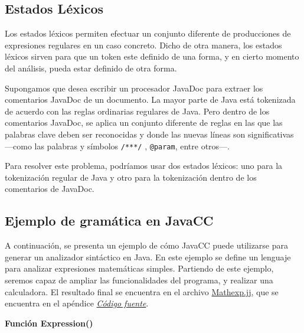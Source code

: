 \subsection{Estados Léxicos}
\noindent Los estados léxicos permiten efectuar un conjunto diferente de producciones de expresiones regulares en un caso concreto. Dicho de otra manera, los estados léxicos sirven para que un token este definido de una forma, y en cierto momento del análisis, pueda estar definido de otra forma.

Supongamos que desea escribir un procesador JavaDoc para extraer los comentarios JavaDoc de un documento. La mayor parte de Java está tokenizada de acuerdo con las reglas ordinarias regulares de Java. Pero dentro de los comentarios JavaDoc, se aplica un conjunto diferente de reglas en las que las palabras clave deben ser reconocidas y donde las nuevas líneas son significativas ---como las palabras y símbolos \lstinline|/***/| , \lstinline|@param|, entre otros---.

Para resolver este problema, podríamos usar dos estados léxicos: uno para la tokenización regular de Java y otro para la tokenización dentro de los comentarios de JavaDoc.

\subsection{Ejemplo de gramática en JavaCC}
\noindent A continuación, se presenta un ejemplo de cómo JavaCC puede utilizarse para generar un analizador sintáctico en Java. En este ejemplo se define un lenguaje para analizar expresiones matemáticas simples. Partiendo de este ejemplo, seremos capaz de ampliar las funcionalidades del programa, y realizar una calculadora. El resultado final se encuentra en el archivo \hyperref[sec:mathexp]{Mathexp.jj}, que se encuentra en el apéndice \hyperref[sec:codigofuente]{\textit{Código fuente}}.

\phantom{text}

\noindent \textbf{Función Expression()}

\phantom{text}

\lstset{inputencoding=utf8/latin1}


